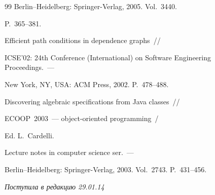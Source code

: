 {{\begin{thebibliography}{99}
Berlin--Heidelberg: Springer-Verlag, 2005. Vol.~3440.


P.~365--381.













 Efficient path conditions in dependence graphs~/\!\!/


ICSE'02: 24th Conference (International) on Software Engineering Proceedings.~---


New York, NY, USA: ACM Press, 2002. P.~478--488.







 Discovering algebraic specifications from Java classes~/\!\!/


ECOOP~2003~--- object-oriented programming~/


Ed. L.~Cardelli.


Lecture notes in computer science ser.~---


Berlin--Heidelberg: Springer-Verlag, 2003.  Vol.~2743. P.~431--456.

















\end{thebibliography}


}


}










\hfill{\small\textit{Поступила в редакцию 29.01.14}}


















